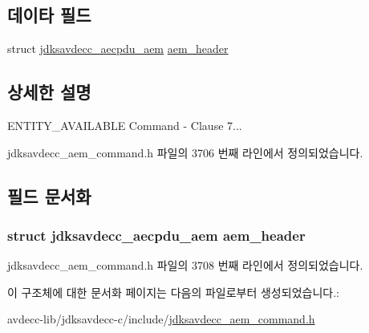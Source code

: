 \subsection*{데이타 필드}
\begin{DoxyCompactItemize}
\item 
struct \hyperlink{structjdksavdecc__aecpdu__aem}{jdksavdecc\+\_\+aecpdu\+\_\+aem} \hyperlink{structjdksavdecc__aem__command__entity__available_ae1e77ccb75ff5021ad923221eab38294}{aem\+\_\+header}
\end{DoxyCompactItemize}


\subsection{상세한 설명}
E\+N\+T\+I\+T\+Y\+\_\+\+A\+V\+A\+I\+L\+A\+B\+LE Command -\/ Clause 7... 

jdksavdecc\+\_\+aem\+\_\+command.\+h 파일의 3706 번째 라인에서 정의되었습니다.



\subsection{필드 문서화}
\subsubsection[{\texorpdfstring{aem\+\_\+header}{aem_header}}]{\setlength{\rightskip}{0pt plus 5cm}struct {\bf jdksavdecc\+\_\+aecpdu\+\_\+aem} aem\+\_\+header}\hypertarget{structjdksavdecc__aem__command__entity__available_ae1e77ccb75ff5021ad923221eab38294}{}\label{structjdksavdecc__aem__command__entity__available_ae1e77ccb75ff5021ad923221eab38294}


jdksavdecc\+\_\+aem\+\_\+command.\+h 파일의 3708 번째 라인에서 정의되었습니다.



이 구조체에 대한 문서화 페이지는 다음의 파일로부터 생성되었습니다.\+:\begin{DoxyCompactItemize}
\item 
avdecc-\/lib/jdksavdecc-\/c/include/\hyperlink{jdksavdecc__aem__command_8h}{jdksavdecc\+\_\+aem\+\_\+command.\+h}\end{DoxyCompactItemize}
